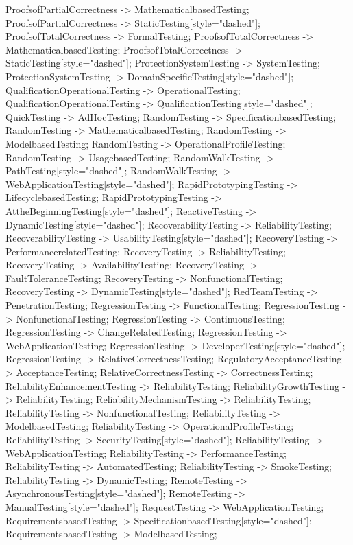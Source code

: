 \documentclass{article}
\begin{document}
{ProofsofPartialCorrectness -> MathematicalbasedTesting;
ProofsofPartialCorrectness -> StaticTesting[style="dashed"];
ProofsofTotalCorrectness -> FormalTesting;
ProofsofTotalCorrectness -> MathematicalbasedTesting;
ProofsofTotalCorrectness -> StaticTesting[style="dashed"];
ProtectionSystemTesting -> SystemTesting;
ProtectionSystemTesting -> DomainSpecificTesting[style="dashed"];
QualificationOperationalTesting -> OperationalTesting;
QualificationOperationalTesting -> QualificationTesting[style="dashed"];
QuickTesting -> AdHocTesting;
RandomTesting -> SpecificationbasedTesting;
RandomTesting -> MathematicalbasedTesting;
RandomTesting -> ModelbasedTesting;
RandomTesting -> OperationalProfileTesting;
RandomTesting -> UsagebasedTesting;
RandomWalkTesting -> PathTesting[style="dashed"];
RandomWalkTesting -> WebApplicationTesting[style="dashed"];
RapidPrototypingTesting -> LifecyclebasedTesting;
RapidPrototypingTesting -> AttheBeginningTesting[style="dashed"];
ReactiveTesting -> DynamicTesting[style="dashed"];
RecoverabilityTesting -> ReliabilityTesting;
RecoverabilityTesting -> UsabilityTesting[style="dashed"];
RecoveryTesting -> PerformancerelatedTesting;
RecoveryTesting -> ReliabilityTesting;
RecoveryTesting -> AvailabilityTesting;
RecoveryTesting -> FaultToleranceTesting;
RecoveryTesting -> NonfunctionalTesting;
RecoveryTesting -> DynamicTesting[style="dashed"];
RedTeamTesting -> PenetrationTesting;
RegressionTesting -> FunctionalTesting;
RegressionTesting -> NonfunctionalTesting;
RegressionTesting -> ContinuousTesting;
RegressionTesting -> ChangeRelatedTesting;
RegressionTesting -> WebApplicationTesting;
RegressionTesting -> DeveloperTesting[style="dashed"];
RegressionTesting -> RelativeCorrectnessTesting;
RegulatoryAcceptanceTesting -> AcceptanceTesting;
RelativeCorrectnessTesting -> CorrectnessTesting;
ReliabilityEnhancementTesting -> ReliabilityTesting;
ReliabilityGrowthTesting -> ReliabilityTesting;
ReliabilityMechanismTesting -> ReliabilityTesting;
ReliabilityTesting -> NonfunctionalTesting;
ReliabilityTesting -> ModelbasedTesting;
ReliabilityTesting -> OperationalProfileTesting;
ReliabilityTesting -> SecurityTesting[style="dashed"];
ReliabilityTesting -> WebApplicationTesting;
ReliabilityTesting -> PerformanceTesting;
ReliabilityTesting -> AutomatedTesting;
ReliabilityTesting -> SmokeTesting;
ReliabilityTesting -> DynamicTesting;
RemoteTesting -> AsynchronousTesting[style="dashed"];
RemoteTesting -> ManualTesting[style="dashed"];
RequestTesting -> WebApplicationTesting;
RequirementsbasedTesting -> SpecificationbasedTesting[style="dashed"];
RequirementsbasedTesting -> ModelbasedTesting;
}
\end{document}
